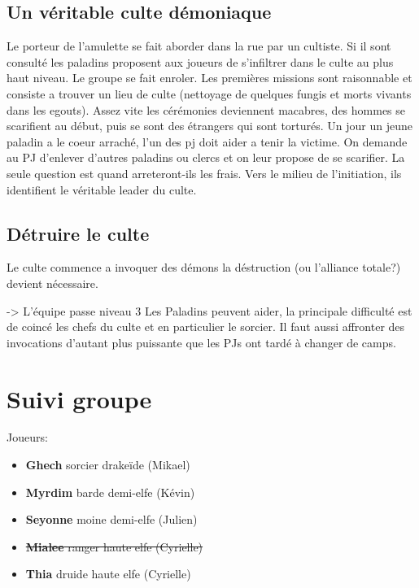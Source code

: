 \subsection{Un véritable culte démoniaque}

Le porteur de l'amulette se fait aborder dans la rue par un cultiste. Si il sont consulté les paladins
proposent aux joueurs de s'infiltrer dans le culte au plus haut niveau. Le groupe se fait enroler. 
Les premières missions sont raisonnable et consiste a trouver un lieu de culte (nettoyage de quelques
fungis et morts vivants dans les egouts). Assez vite les cérémonies deviennent macabres, des hommes se 
scarifient au début, puis se sont des étrangers qui sont torturés. Un jour un jeune paladin a le coeur 
arraché, l'un des pj doit aider a tenir la victime. On demande au PJ d'enlever d'autres paladins ou
clercs et on leur propose de se scarifier. La seule question est quand arreteront-ils les frais. Vers le 
milieu de l'initiation, ils identifient le véritable leader du culte.

\subsection{Détruire le culte}

Le culte commence a invoquer des démons la déstruction (ou l'alliance totale?) devient nécessaire.

 -> L'équipe passe niveau 3
Les Paladins peuvent aider, la principale difficulté est de coincé les chefs du culte et en particulier
le sorcier. Il faut aussi affronter des invocations d'autant plus puissante que les PJs ont tardé à changer
de camps. 



\section{Suivi groupe}

Joueurs:
\begin{itemize}
  \item {\bf Ghech} sorcier drakeïde (Mikael)
  \item {\bf Myrdim} barde demi-elfe (Kévin)
  \item {\bf Seyonne} moine demi-elfe (Julien)
  \item \sout{{\bf Mialee} ranger haute elfe (Cyrielle)}
  \item {\bf Thia} druide haute elfe (Cyrielle)
\end{itemize}

